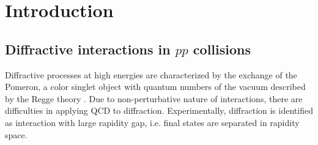 

\chapter{Introduction}\label{chap:introduction}

\section{Diffractive interactions in $pp$ collisions}
Diffractive processes at high energies are characterized by the exchange of the Pomeron, a color singlet object with quantum numbers of the vacuum described by the Regge theory \cite{barone}\cite{donnachie_dosch_landshoff_nachtmann_2002}. Due to non-perturbative nature of interactions, there are difficulties in applying QCD to diffraction. Experimentally, diffraction is identified as interaction with large rapidity gap, i.e. final states are separated in rapidity space.


